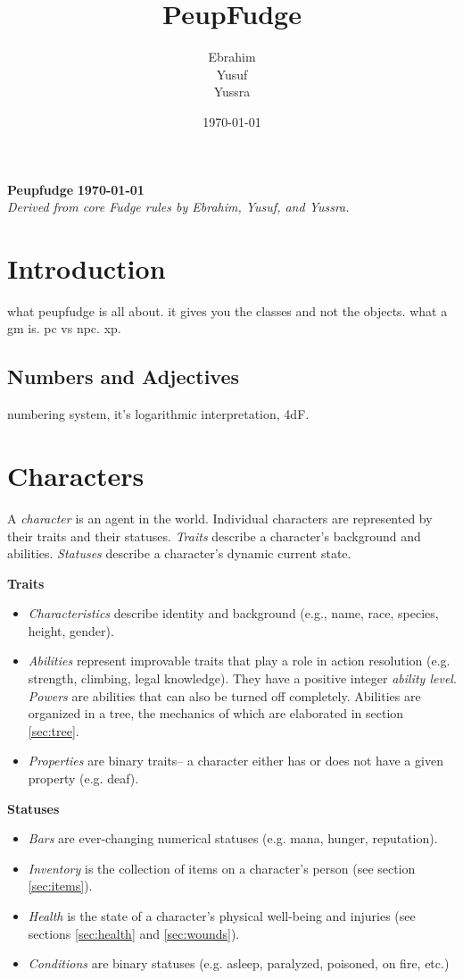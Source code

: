 \documentclass[12pt]{article}
\title{PeupFudge}
\author{Ebrahim \\ Yusuf \\ Yussra}
\date{\today}
\newcommand{\notes}[1]{{\color{Tan} #1}}
\begin{document}
\textbf{Peupfudge}
\hfill
\textbf{\today}\\
\textit{Derived from core Fudge rules by Ebrahim, Yusuf, and Yussra.}

\section{Introduction}
\notes{what peupfudge is all about.
it gives you the classes and not the objects.
what a gm is.
pc vs npc.
xp.}

\subsection{Numbers and Adjectives} \label{sec:quant}

\notes{
numbering system, it's logarithmic interpretation, 4dF.
}

\section{Characters}
A \emph{character} is an agent in the world.
Individual characters are represented by their traits and their statuses.
\emph{Traits} describe a character's background and abilities.
\emph{Statuses} describe a character's dynamic current state.

\textbf{Traits}\vspace{-1em}
\begin{itemize}
\item \emph{Characteristics}
describe identity and background
(e.g., name, race, species, height, gender).
\item \emph{Abilities}
represent improvable traits that play a role in action resolution
(e.g. strength, climbing, legal knowledge).
They have a positive integer \emph{ability level}.
\emph{Powers} are abilities that can also be turned off completely.
Abilities are organized in a tree, the mechanics of which are elaborated in section \ref{sec:tree}.
\item \emph{Properties} are binary traits-- a character either has or does not have a given property (e.g. deaf).
\end{itemize}

\textbf{Statuses}\vspace{-1em}
\begin{itemize}
\item \emph{Bars} are ever-changing numerical statuses (e.g. mana, hunger, reputation).
\item \emph{Inventory} is the collection of items on a character's person (see section \ref{sec:items}).
\item \emph{Health} is the state of a character's physical well-being and injuries (see sections \ref{sec:health} and \ref{sec:wounds}).
\item \emph{Conditions} are binary statuses (e.g. asleep, paralyzed, poisoned, on fire, etc.)
\end{itemize}
\end{document}
